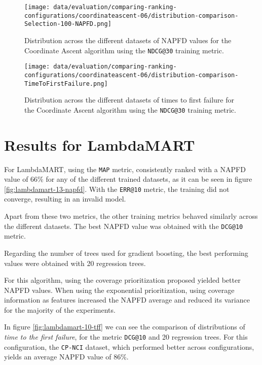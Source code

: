 \begin{figure}
    \centering
    \begin{minipage}{.45\textwidth}
        \centering
        \label{fig:coordinate-ascent-06-napfd}
        \texttt{[image: data/evaluation/comparing-ranking-configurations/coordinateascent-06/distribution-comparison-Selection-100-NAPFD.png]}
        \parbox{0.9\textwidth}{\caption{Distribution across the different datasets of NAPFD values for the Coordinate Ascent algorithm using the \texttt{NDCG@30} training metric.}}
    \end{minipage}%
    \begin{minipage}{.45\textwidth}
        \centering
        \label{fig:coordinate-ascent-06-tff}
        \texttt{[image: data/evaluation/comparing-ranking-configurations/coordinateascent-06/distribution-comparison-TimeToFirstFailure.png]}
        \parbox{0.9\textwidth}{\caption{Distribution across the different datasets of times to first failure for the Coordinate Ascent algorithm using the \texttt{NDCG@30} training metric.}}
    \end{minipage}%
\end{figure}

\section{Results for LambdaMART}
For LambdaMART, using the \texttt{MAP} metric, consistently ranked with a NAPFD value of 66\% for any of the different 
trained datasets, as it can be seen in figure \ref{fig:lambdamart-13-napfd}. With the \texttt{ERR@10} metric, the training did not converge, resulting in an invalid model.

Apart from these two metrics, the other training metrics behaved similarly across the different datasets. The best NAPFD
value was obtained with the \texttt{DCG@10} metric.

Regarding the number of trees used for gradient boosting, the best performing values were obtained with 20 regression trees.

For this algorithm, using the coverage prioritization proposed yielded better NAPFD values. When using the exponential prioritization,
using coverage information as features increased the NAPFD average and reduced its variance for the majority of the experiments.

In figure \ref{fig:lambdamart-10-tff} we can see the comparison of distributions of \emph{time to the first failure},
for the metric \texttt{DCG@10} and 20 regression trees. For this configuration, the \texttt{CP-NCI} dataset,
which performed better across configurations, yields an average NAPFD value of 86\%.

